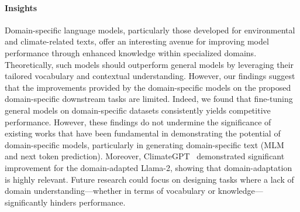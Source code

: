 \paragraph{Insights} Domain-specific language models, particularly those developed for environmental and climate-related texts, offer an interesting avenue for improving model performance through enhanced knowledge within specialized domains. Theoretically, such models should outperform general models by leveraging their tailored vocabulary and contextual understanding. However, our findings suggest that the improvements provided by the domain-specific models on the proposed domain-specific downstream tasks are limited. Indeed, we found that fine-tuning general models on domain-specific datasets consistently yields competitive performance. However, these findings do not undermine the significance of existing works that have been fundamental in demonstrating the potential of domain-specific models, particularly in generating domain-specific text (MLM and next token prediction). Moreover, ClimateGPT~\cite{thulke2024climategpt}
demonstrated significant improvement for the domain-adapted Llama-2, showing that domain-adaptation is highly relevant. Future research could focus on designing tasks where a lack of domain understanding—whether in terms of vocabulary or knowledge—significantly hinders performance.






